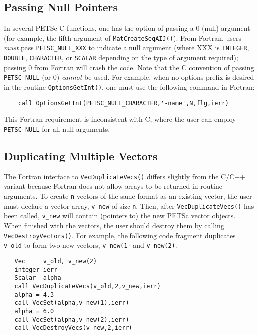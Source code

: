 \subsection{Passing Null Pointers}

In several PETSc C functions, one has the option of passing a 0 (null)
argument (for example, the fifth argument of {\tt MatCreateSeqAIJ()}).
From Fortran, users {\em must} pass {\tt PETSC\_NULL\_XXX} to indicate a
null argument (where XXX is {\tt INTEGER}, {\tt DOUBLE}, {\tt CHARACTER},
or {\tt SCALAR} depending on the type of argument required); 
 passing  0 from 
 Fortran   will crash
the code.   Note
that the C convention of passing {\tt PETSC\_NULL} (or 0) {\em cannot}
be used.  For example, when no options prefix is desired in the
routine {\tt OptionsGetInt()}, one must use the following command in
Fortran:
\begin{verbatim}
    call OptionsGetInt(PETSC_NULL_CHARACTER,'-name',N,flg,ierr)
\end{verbatim}

This Fortran requirement is inconsistent with C, where the 
user can employ {\tt PETSC\_NULL} for all null arguments. 

\subsection{Duplicating Multiple Vectors}
\label{sec:fortvecd}

The Fortran interface to {\tt VecDuplicateVecs()} differs slightly
from the C/C++ variant because Fortran does not allow arrays to be
returned in routine arguments.  To create {\tt n} vectors of the same
format as an existing vector, the user must declare a vector array,
{\tt v\_new} of size {\tt n}.  Then, after {\tt VecDuplicateVecs()} has
been called, {\tt v\_new} will contain (pointers to) the new PETSc
vector objects.  When finished with the vectors, the user should
destroy them by calling {\tt VecDestroyVectors()}.
 For example, the following code fragment
duplicates {\tt v\_old} to form two new vectors, {\tt v\_new(1)} and {\tt v\_new(2)}.
\begin{verbatim}
   Vec     v_old, v_new(2)
   integer ierr
   Scalar  alpha
   call VecDuplicateVecs(v_old,2,v_new,ierr)
   alpha = 4.3
   call VecSet(alpha,v_new(1),ierr)
   alpha = 6.0
   call VecSet(alpha,v_new(2),ierr)
   call VecDestroyVecs(v_new,2,ierr)
\end{verbatim}

